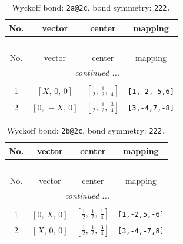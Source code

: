 \documentclass[fleqn,8pt]{jsarticle}
\begin{document}
\begin{longtable}{cccc}
\caption{Wyckoff bond: {\tt 2a@2c}, bond symmetry: {\tt 222.}}
 \\
 \hline \hline
No. & vector & center & mapping \\ \hline \endfirsthead

\multicolumn{3}{l}{\tablename\ \thetable{}} \\
 \hline \hline
No. & vector & center & mapping \\ \hline \endhead

 \hline \hline
\multicolumn{3}{r}{\footnotesize\it continued ...} \\ \endfoot

 \hline \hline
\multicolumn{3}{r}{} \\ \endlastfoot

1 & $\left[ X,\, 0,\, 0 \right]$ & $\left[ \frac{1}{2},\, \frac{1}{2},\, \frac{1}{4} \right]$ & {\tt [1,-2,-5,6]} \\ \hline
2 & $\left[ 0,\, - X,\, 0 \right]$ & $\left[ \frac{1}{2},\, \frac{1}{2},\, \frac{3}{4} \right]$ & {\tt [3,-4,7,-8]} \\
\end{longtable}
\renewcommand{\arraystretch}{1.2}
\begin{longtable}{cccc}
\caption{Wyckoff bond: {\tt 2b@2c}, bond symmetry: {\tt 222.}}
 \\
 \hline \hline
No. & vector & center & mapping \\ \hline \endfirsthead

\multicolumn{3}{l}{\tablename\ \thetable{}} \\
 \hline \hline
No. & vector & center & mapping \\ \hline \endhead

 \hline \hline
\multicolumn{3}{r}{\footnotesize\it continued ...} \\ \endfoot

 \hline \hline
\multicolumn{3}{r}{} \\ \endlastfoot

1 & $\left[ 0,\, X,\, 0 \right]$ & $\left[ \frac{1}{2},\, \frac{1}{2},\, \frac{1}{4} \right]$ & {\tt [1,-2,5,-6]} \\ \hline
2 & $\left[ X,\, 0,\, 0 \right]$ & $\left[ \frac{1}{2},\, \frac{1}{2},\, \frac{3}{4} \right]$ & {\tt [3,-4,-7,8]} \\
\end{longtable}
\renewcommand{\arraystretch}{1.2}
\end{document}
